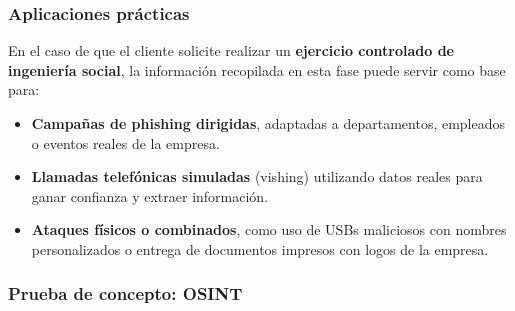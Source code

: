 \documentclass[a4paper, 11pt]{article}
\begin{document}
\subsubsection*{Aplicaciones prácticas}

En el caso de que el cliente solicite realizar un \textbf{ejercicio controlado de ingeniería social}, la información recopilada en esta fase puede servir como base para:

\begin{itemize}
    \item \textbf{Campañas de phishing dirigidas}, adaptadas a departamentos, empleados o eventos reales de la empresa.
    \item \textbf{Llamadas telefónicas simuladas} (vishing) utilizando datos reales para ganar confianza y extraer información.
    \item \textbf{Ataques físicos o combinados}, como uso de USBs maliciosos con nombres personalizados o entrega de documentos impresos con logos de la empresa.
\end{itemize}










\subsubsection*{Prueba de concepto: OSINT}
\end{document}
